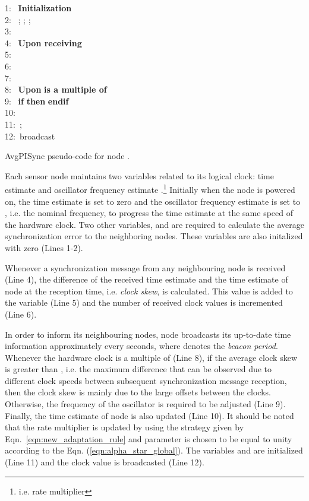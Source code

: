 \documentclass[english,a4paper,10pt,final]{article}
\numberwithin{equation}{section}
\numberwithin{figure}{section}
\begin{document}
\begin{algorithm}

\label{alg:PI-dist}
1:~  \textbf{Initialization} \\
2:~ ; ; ; \\
3:~ \\
4:~  \textbf{Upon receiving}  \\
5:~  \\
6:~  \\
7:~\\
8:~  \textbf{Upon}  \textbf{is a multiple of } \\
9:~  \textbf{if}   \textbf{then}  \textbf{endif} \\
10:~ \\
11:~;  \\
12:~broadcast 

\caption{AvgPISync pseudo-code for node .}
\end{algorithm}

Each sensor node  maintains two variables related to its logical clock: time estimate  and  oscillator frequency estimate .\footnote{i.e. rate multiplier} Initially when the node is powered on, the time estimate is set to zero and the oscillator frequency estimate is set to , i.e. the nominal frequency, to progress the time estimate at the same speed of the hardware clock. Two other variables,  and  are required to calculate the average synchronization error to the neighboring nodes. These variables are also initalized with zero (Lines 1-2).

Whenever a synchronization message from any neighbouring node is received (Line 4), the difference of the received time estimate  and the time estimate  of node  at the reception time, i.e. \textit{clock skew},  is calculated. This value is added to the  variable (Line 5) and the number of received clock values is incremented (Line 6).

In order to inform its neighbouring nodes, node  broadcasts its up-to-date time information approximately every  seconds, where  denotes the \textit{beacon period}. Whenever the hardware clock is a multiple of  (Line 8), if the average clock skew  is greater than , i.e. the maximum difference that can be observed due to different clock speeds between subsequent synchronization message reception, then the clock skew is mainly due to the large offsets between the clocks. Otherwise, the frequency of the oscillator is required to be adjusted (Line 9). Finally, the time estimate  of node  is also updated (Line 10). It should be noted that the rate multiplier  is updated by using the strategy given by  Eqn.~\eqref{eqn:new_adaptation_rule} and parameter  is chosen to be equal to unity according to the Eqn. (\ref{eqn:alpha_star_global}). The variables  and  are initialized (Line 11)  and the clock value is broadcasted (Line 12).
\end{document}
